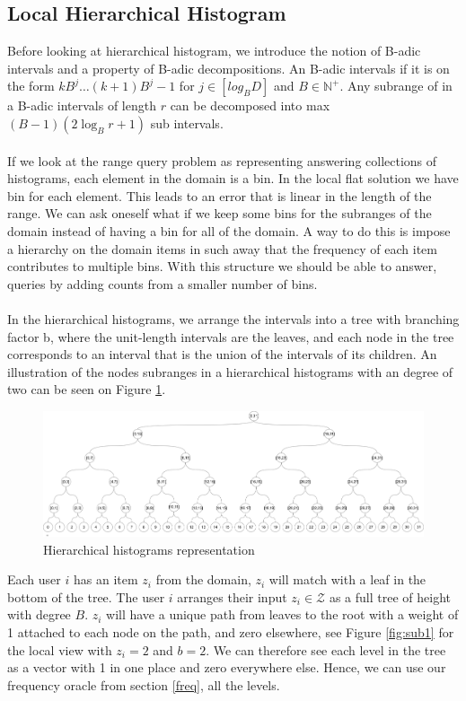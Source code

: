 \documentclass[11pt]{article}
\theoremstyle{definition}
\begin{document}
\subsection{Local Hierarchical Histogram}\label{hh}
Before looking at hierarchical histogram, we introduce the notion of B-adic intervals and a property of B-adic decompositions. An B-adic intervals if it is on the form  $k B^{j} \ldots(k+1) B^{j}-1$ for $j\in [log_BD]$ and $B\in\mathbb{N}^+$. Any subrange of in a B-adic intervals of length $r$  can be decomposed into max  $(B-1)\left(2 \log _{B} r+1\right)$ sub intervals. \\ \\
If we look at the range query problem as representing answering collections of histograms, each element in the domain is a bin. In the local flat solution we have bin for each element. This leads to an error that is linear in the length of the range. We can ask oneself what if we keep some bins for the subranges of the domain instead of having a bin for all of the domain. A way to do this is impose a hierarchy on the domain items in such away that the frequency of each item contributes to multiple bins. With this structure we should be able to answer, queries by adding counts from a smaller number of bins. \\ \\
In the hierarchical histograms, we arrange the intervals into a tree with branching factor b, where the unit-length intervals are the leaves, and each node in the tree corresponds to an interval that is the union of the intervals of its children. An illustration of the nodes subranges in a hierarchical histograms with an degree of two can be seen on Figure \ref{fig:disjoint}.
\begin{figure}[H]
    \centering
    \includegraphics[width=.8\linewidth]{figures/disjoint_tree.png}
    \caption{Hierarchical histograms representation}
    \label{fig:disjoint}
\end{figure}
Each user $i$ has an item $z_i$ from the domain, $z_i$ will match with a leaf in the bottom of the tree. The user $i$ arranges their input $z_i\in \mathcal{Z}$ as a full tree of height with degree $B$. $z_i$ will have a unique path from leaves to the root with a weight of 1 attached to each node on the path, and zero elsewhere, see Figure \ref{fig:sub1} for the local view with  $z_i=2$ and $b=2$.  We can therefore see each level in the tree as a vector with 1 in one place and zero everywhere else. Hence, we can use our frequency oracle from section \ref{freq}, all the levels.  \\ \\
\end{document}
